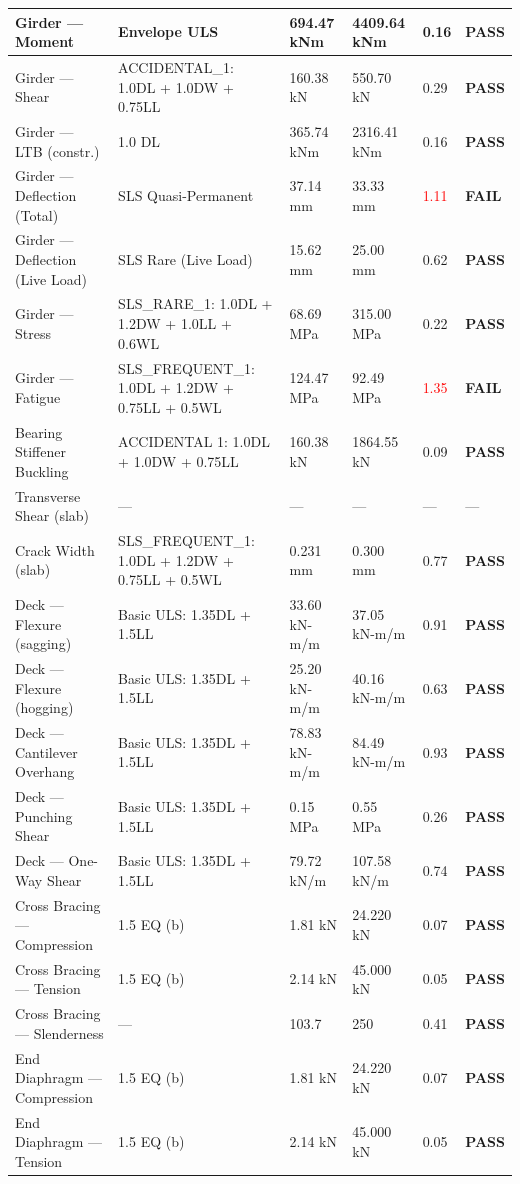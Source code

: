 \documentclass[12pt,a4paper]{report}
\numberwithin{table}{chapter}
\numberwithin{figure}{chapter}
\newcommand{\passBadge}{\colorbox{passBg}{\textcolor{passGreen}{\textbf{PASS}}}}
\newcommand{\failBadge}{\colorbox{failBg}{\textcolor{failRed}{\textbf{FAIL}}}}
\begin{document}
\begin{longtable}{|C{3.2cm}|L{4.2cm}|C{2.1cm}|C{2.1cm}|C{1.5cm}|C{1.6cm}|}
Girder --- Moment & Envelope ULS & 694.47 kNm & 4409.64 kNm & 0.16 & \passBadge{} \\[6pt]
\hline
Girder --- Shear & ACCIDENTAL\_\allowbreak{}1:\allowbreak{} 1.0DL + 1.0DW + 0.75LL & 160.38 kN & 550.70 kN & 0.29 & \passBadge{} \\[6pt]
\hline
Girder --- LTB (constr.) & 1.0 DL & 365.74 kNm & 2316.41 kNm & 0.16 & \passBadge{} \\[6pt]
\hline
Girder --- Deflection (Total) & SLS Quasi-Permanent & 37.14 mm & 33.33 mm & \textcolor{red}{1.11} & \failBadge{} \\[6pt]
\hline
Girder --- Deflection (Live Load) & SLS Rare (Live Load) & 15.62 mm & 25.00 mm & 0.62 & \passBadge{} \\[6pt]
\hline
Girder --- Stress & SLS\_\allowbreak{}RARE\_\allowbreak{}1:\allowbreak{} 1.0DL + 1.2DW + 1.0LL + 0.6WL & 68.69 MPa & 315.00 MPa & 0.22 & \passBadge{} \\[6pt]
\hline
Girder --- Fatigue & SLS\_\allowbreak{}FREQUENT\_\allowbreak{}1:\allowbreak{} 1.0DL + 1.2DW + 0.75LL + 0.5WL & 124.47 MPa & 92.49 MPa & \textcolor{red}{1.35} & \failBadge{} \\[6pt]
\hline
Bearing Stiffener Buckling & ACCIDENTAL 1: 1.0DL + 1.0DW + 0.75LL & 160.38 kN & 1864.55 kN & 0.09 & \passBadge{} \\[6pt]
\hline
Transverse Shear (slab) & --- & --- & --- & --- & --- \\[6pt]
\hline
Crack Width (slab) & SLS\_\allowbreak{}FREQUENT\_\allowbreak{}1:\allowbreak{} 1.0DL + 1.2DW + 0.75LL + 0.5WL & 0.231 mm & 0.300 mm & 0.77 & \passBadge{} \\[6pt]
\hline
Deck --- Flexure (sagging) & Basic ULS: 1.35DL + 1.5LL & 33.60 kN-m/m & 37.05 kN-m/m & 0.91 & \passBadge{} \\[6pt]
\hline
Deck --- Flexure (hogging) & Basic ULS: 1.35DL + 1.5LL & 25.20 kN-m/m & 40.16 kN-m/m & 0.63 & \passBadge{} \\[6pt]
\hline
Deck --- Cantilever Overhang & Basic ULS: 1.35DL + 1.5LL & 78.83 kN-m/m & 84.49 kN-m/m & 0.93 & \passBadge{} \\[6pt]
\hline
Deck --- Punching Shear & Basic ULS: 1.35DL + 1.5LL & 0.15 MPa & 0.55 MPa & 0.26 & \passBadge{} \\[6pt]
\hline
Deck --- One-Way Shear & Basic ULS: 1.35DL + 1.5LL & 79.72 kN/m & 107.58 kN/m & 0.74 & \passBadge{} \\[6pt]
\hline
Cross Bracing --- Compression & 1.5 EQ (b) & 1.81 kN & 24.220 kN & 0.07 & \passBadge{} \\[6pt]
\hline
Cross Bracing --- Tension & 1.5 EQ (b) & 2.14 kN & 45.000 kN & 0.05 & \passBadge{} \\[6pt]
\hline
Cross Bracing --- Slenderness & --- & 103.7 & 250 & 0.41 & \passBadge{} \\[6pt]
\hline
End Diaphragm --- Compression & 1.5 EQ (b) & 1.81 kN & 24.220 kN & 0.07 & \passBadge{} \\[6pt]
\hline
End Diaphragm --- Tension & 1.5 EQ (b) & 2.14 kN & 45.000 kN & 0.05 & \passBadge{} \\[6pt]
\hline
\end{longtable}
\end{document}
